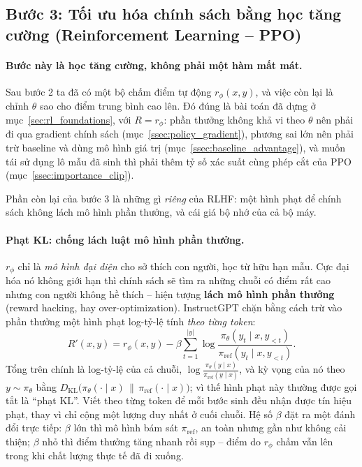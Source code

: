 \subsection*{Bước 3: Tối ưu hóa chính sách bằng học tăng cường (Reinforcement Learning -- PPO)}

\paragraph{Bước này là học tăng cường, không phải một hàm mất mát.}
Sau bước 2 ta đã có một bộ chấm điểm tự động \( r_{\phi}(x,y) \), và việc còn lại là chỉnh \( \theta \) sao cho điểm trung bình cao lên. Đó đúng là bài toán đã dựng ở mục~\ref{sec:rl_foundations}, với \( R = r_{\phi} \): phần thưởng không khả vi theo \( \theta \) nên phải đi qua gradient chính sách (mục~\ref{ssec:policy_gradient}), phương sai lớn nên phải trừ baseline và dùng mô hình giá trị (mục~\ref{ssec:baseline_advantage}), và muốn tái sử dụng lô mẫu đã sinh thì phải thêm tỷ số xác suất cùng phép cắt của PPO (mục~\ref{ssec:importance_clip}).

Phần còn lại của bước 3 là những gì \emph{riêng} của RLHF: một hình phạt để chính sách không lách mô hình phần thưởng, và cái giá bộ nhớ của cả bộ máy.

\paragraph{Phạt KL: chống lách luật mô hình phần thưởng.}
\( r_{\phi} \) chỉ là \emph{mô hình đại diện} cho sở thích con người, học từ hữu hạn mẫu. Cực đại hóa nó không giới hạn thì chính sách sẽ tìm ra những chuỗi có điểm rất cao nhưng con người không hề thích -- hiện tượng \textbf{lách mô hình phần thưởng} (reward hacking, hay over-optimization). InstructGPT \cite{ouyang2022training} chặn bằng cách trừ vào phần thưởng một hình phạt log-tỷ-lệ tính \emph{theo từng token}:
\[
    R'(x, y)
    = r_{\phi}(x, y)
    - \beta \sum_{t=1}^{|y|} \log \frac{
        \pi_{\theta}(y_t \mid x, y_{<t})
    }{
        \pi_{\text{ref}}(y_t \mid x, y_{<t})
    }.
\]
Tổng trên chính là log-tỷ-lệ của cả chuỗi, \( \log \frac{\pi_{\theta}(y \mid x)}{\pi_{\text{ref}}(y \mid x)} \), và kỳ vọng của nó theo \( y \sim \pi_{\theta} \) bằng \( D_{\text{KL}}\big(\pi_{\theta}(\cdot \mid x) \,\big\|\, \pi_{\text{ref}}(\cdot \mid x)\big) \); vì thế hình phạt này thường được gọi tắt là ``phạt KL''. Viết theo từng token để mỗi bước sinh đều nhận được tín hiệu phạt, thay vì chỉ cộng một lượng duy nhất ở cuối chuỗi. Hệ số \( \beta \) đặt ra một đánh đổi trực tiếp: \( \beta \) lớn thì mô hình bám sát \( \pi_{\text{ref}} \), an toàn nhưng gần như không cải thiện; \( \beta \) nhỏ thì điểm thưởng tăng nhanh rồi sụp -- điểm do \( r_{\phi} \) chấm vẫn lên trong khi chất lượng thực tế đã đi xuống.

